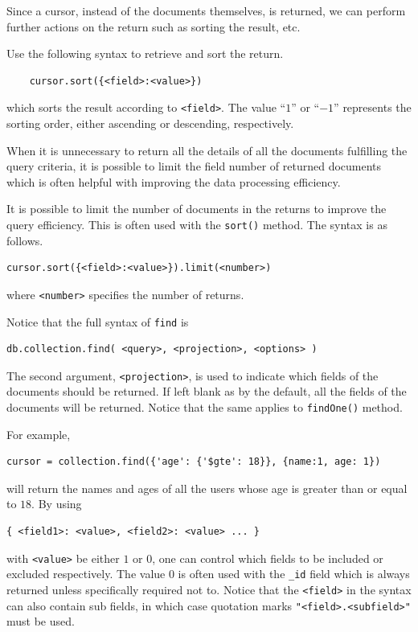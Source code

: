 Since a cursor, instead of the documents themselves, is returned, we can perform further actions on the return such as sorting the result, etc.

Use the following syntax to retrieve and sort the return.
\begin{lstlisting}
	cursor.sort({<field>:<value>})
\end{lstlisting}
which sorts the result according to \verb|<field>|. The value ``$1$'' or ``$-1$'' represents the sorting order, either ascending or descending, respectively.

When it is unnecessary to return all the details of all the documents fulfilling the query criteria, it is possible to limit the field number of returned documents which is often helpful with improving the data processing efficiency.

It is possible to limit the number of documents in the returns to improve the query efficiency. This is often used with the \verb|sort()| method. The syntax is as follows.
\begin{lstlisting}
cursor.sort({<field>:<value>}).limit(<number>)
\end{lstlisting}
where \verb|<number>| specifies the number of returns.

Notice that the full syntax of \verb|find| is
\begin{lstlisting}
db.collection.find( <query>, <projection>, <options> )
\end{lstlisting}
The second argument, \verb|<projection>|, is used to indicate which fields of the documents should be returned. If left blank as by the default, all the fields of the documents will be returned. Notice that the same applies to \verb|findOne()| method.

For example,
\begin{lstlisting}
cursor = collection.find({'age': {'$gte': 18}}, {name:1, age: 1})
\end{lstlisting}
will return the names and ages of all the users whose age is greater than or equal to $18$. By using
\begin{lstlisting}
{ <field1>: <value>, <field2>: <value> ... }
\end{lstlisting}
with \verb|<value>| be either $1$ or $0$, one can control which fields to be included or excluded respectively. The value $0$ is often used with the \verb|_id| field which is always returned unless specifically required not to. Notice that the \verb|<field>| in the syntax can also contain sub fields, in which case quotation marks \verb|"<field>.<subfield>"| must be used.

